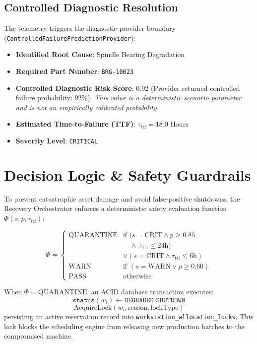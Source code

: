 \documentclass[10pt,twocolumn,a4paper]{article}
\begin{document}
\subsection{Controlled Diagnostic Resolution}
The telemetry triggers the diagnostic provider boundary (\texttt{ControlledFailurePredictionProvider}):
\begin{itemize}
    \item \textbf{Identified Root Cause}: Spindle Bearing Degradation
    \item \textbf{Required Part Number}: \texttt{BRG-10023}
    \item \textbf{Controlled Diagnostic Risk Score}: $0.92$ (Provider-returned controlled failure probability: $92\%$). \textit{This value is a deterministic scenario parameter and is not an empirically calibrated probability.}
    \item \textbf{Estimated Time-to-Failure (TTF)}: $\tau_{\text{ttf}} = 18.0\text{ Hours}$
    \item \textbf{Severity Level}: \texttt{CRITICAL}
\end{itemize}

\section{Decision Logic \& Safety Guardrails}
\label{sec:safety_model}
To prevent catastrophic asset damage and avoid false-positive shutdowns, the Recovery Orchestrator enforces a deterministic safety evaluation function $\Phi(s, p, \tau_{\text{ttf}})$:

\begin{equation}
\Phi = \begin{cases} 
\text{QUARANTINE} & \text{if } (s = \text{CRIT} \land p \ge 0.85 \\
                  & \quad \land\; \tau_{\text{ttf}} \le 24\text{h}) \\
                  & \lor (s = \text{CRIT} \land \tau_{\text{ttf}} \le 6\text{h}) \\
\text{WARN}       & \text{if } (s = \text{WARN} \lor p \ge 0.60) \\
\text{PASS}       & \text{otherwise}
\end{cases}
\end{equation}

When $\Phi = \text{QUARANTINE}$, an ACID database transaction executes:
\begin{equation}
    \texttt{status}(w_i) \leftarrow \texttt{DEGRADED\_SHUTDOWN}
\end{equation}
\begin{equation}
    \text{AcquireLock}(w_i, \text{reason}, \text{lockType})
\end{equation}
persisting an active reservation record into \texttt{workstation\_allocation\_locks}. This lock blocks the scheduling engine from releasing new production batches to the compromised machine.
\end{document}
